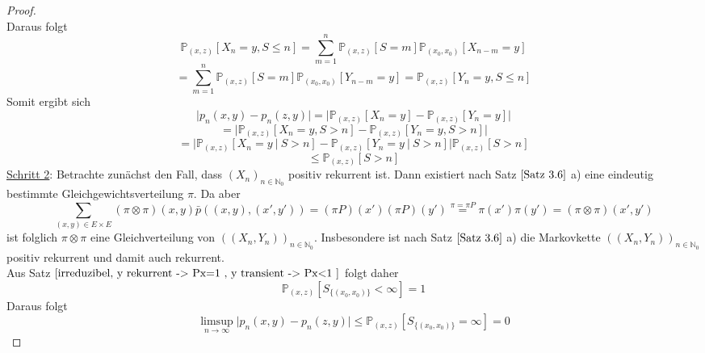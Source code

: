 \documentclass[a4paper,12pt]{scrartcl}
\theoremstyle{definition}
\begin{document}
\begin{proof}
\begin{equation*}
\end{equation*}
Daraus folgt
\begin{equation*}
\mathbb{P}_{(x,z)}[X_{n}=y, S \leq n] = \sum_{m=1}^{n} \mathbb{P}_{(x,z)}[S=m]\mathbb{P}_{(x_{0},x_{0})}[X_{n-m}=y]
\end{equation*}
\begin{equation*}
= \sum_{m=1}^{n} \mathbb{P}_{(x,z)}[S=m]\mathbb{P}_{(x_{0},x_{0})}[Y_{n-m}=y] = \mathbb{P}_{(x,z)}[Y_{n}=y, S \leq n]
\end{equation*}
Somit ergibt sich
\begin{equation*}
\vert p_{n}(x,y) - p_{n}(z,y) \vert = \vert \mathbb{P}_{(x,z)}[X_{n}=y] - \mathbb{P}_{(x,z)}[Y_{n} =y] \vert
\end{equation*}
\begin{equation*}
= \vert \mathbb{P}_{(x,z)}[X_{n}=y, S>n] - \mathbb{P}_{(x,z)}[Y_{n} =y, S>n] \vert
\end{equation*}
\begin{equation*}
= \vert \mathbb{P}_{(x,z)}[X_{n}=y \: | \: S>n] - \mathbb{P}_{(x,z)}[Y_{n} =y \: | \: S>n] \vert \mathbb{P}_{(x,z)}[S>n]
\end{equation*}
\begin{equation*}
\leq \mathbb{P}_{(x,z)}[S>n]
\end{equation*}
\underline{Schritt 2}: Betrachte zunächst den Fall, dass $(X_{n})_{n \in \mathbb{N}_{0}}$ positiv rekurrent ist. Dann existiert nach Satz $\ref{Satz 3.6}$ a) eine eindeutig bestimmte Gleichgewichtsverteilung $\pi$. Da aber
\begin{equation*}
\sum_{(x,y) \in E \times E} (\pi \otimes \pi)(x,y)\bar{p}\left( (x,y),(x',y') \right) = (\pi P)(x')(\pi P)(y') \stackrel{\pi = \pi P}{=} \pi(x') \pi(y') = (\pi \otimes \pi)(x',y')
\end{equation*}
ist folglich $\pi \otimes \pi$ eine Gleichverteilung von $((X_{n},Y_{n}))_{n \in \mathbb{N}_{0}}$. Insbesondere ist nach Satz $\ref{Satz 3.6}$ a) die Markovkette  $((X_{n},Y_{n}))_{n \in \mathbb{N}_{0}}$ positiv rekurrent und damit auch rekurrent.
\\
Aus Satz $\ref{irreduzibel, y rekurrent -> Px=1 , y transient -> Px<1 }$ folgt daher
\begin{equation*}
\mathbb{P}_{(x,z)}[S_{\lbrace (x_{0},x_{0}) \rbrace} < \infty] =1
\end{equation*}
Daraus folgt
\begin{equation*}
\limsup_{n \to \infty} \vert p_{n}(x,y) - p_{n}(z,y) \vert \leq \mathbb{P}_{(x,z)}[S_{\lbrace (x_{0},x_{0}) \rbrace} = \infty] = 0

\end{equation*}
\end{proof}
\end{document}

